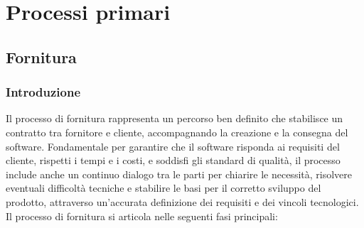 \section{Processi primari}



\subsection{Fornitura}
\subsubsection{Introduzione}
Il processo di fornitura rappresenta un percorso ben definito che stabilisce un contratto tra fornitore e cliente, 
accompagnando la creazione e la consegna del software. 
Fondamentale per garantire che il software risponda ai requisiti del cliente, rispetti i tempi e i costi, 
e soddisfi gli standard di qualità, il processo include anche un continuo dialogo tra le parti per chiarire le necessità, 
risolvere eventuali difficoltà tecniche e stabilire le basi per il corretto sviluppo del prodotto, 
attraverso un'accurata definizione dei requisiti e dei vincoli tecnologici.
Il processo di fornitura si articola nelle seguenti fasi principali:

